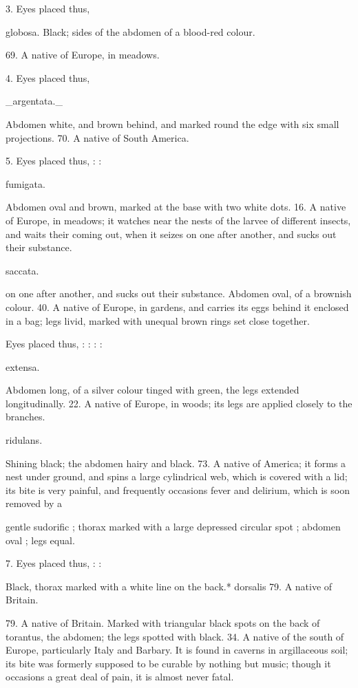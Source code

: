 \documentclass{article}
\begin{document}
3. Eyes placed thus,

globosa. Black; sides of the abdomen of a blood-red colour.

69. A native of Europe, in meadows.

4. Eyes placed thus,

\_argentata.\_

Abdomen white, and brown behind, and marked round the edge with six small projections. 70. A native of South America.

5. Eyes placed thus, : :

fumigata.

Abdomen oval and brown, marked at the base with two white dots. 16. A native of Europe, in meadows; it watches near the nests of the larvee of different insects, and waits their coming out, when it seizes on one after another, and sucks out their substance.

saccata.

on one after another, and sucks out their substance.
Abdomen oval, of a brownish colour. 40. A native of Europe, in gardens, and carries its eggs behind it enclosed in a bag; legs livid, marked with unequal brown rings set close together.

Eyes placed thus, : : : :

extensa.

Abdomen long, of a silver colour tinged with green, the legs extended longitudinally. 22. A native of Europe, in woods; its legs are applied closely to the branches.

ridulans.

Shining black; the abdomen hairy and black. 73. A native of America; it forms a nest under ground, and spins a large cylindrical web, which is covered with a lid; its bite is very painful, and frequently occasions fever and delirium, which is soon removed by a

gentle sudorific ; thorax marked with a large depressed circular spot ; abdomen oval ; legs equal.

7. Eyes placed thus, : :

Black, thorax marked with a white line on the back.* dorsalis
79. A native of Britain.

79. A native of Britain.
Marked with triangular black spots on the back of torantus, the abdomen; the legs spotted with black. 34. A native of the south of Europe, particularly Italy and Barbary. It is found in caverns in argillaceous soil; its bite was formerly supposed to be curable by nothing but music; though it occasions a great deal of pain, it is almost never fatal.
\end{document}

